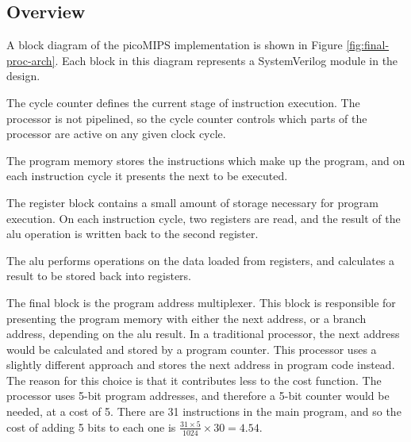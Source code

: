 \subsection{Overview} \label{sec:sys-overview}

A block diagram of the picoMIPS implementation is shown in Figure \ref{fig:final-proc-arch}. Each block in this diagram represents a SystemVerilog module in the design.

The cycle counter defines the current stage of instruction execution. The processor is not pipelined, so the cycle counter controls which parts of the processor are active on any given clock cycle.

The program memory stores the instructions which make up the program, and on each instruction cycle it presents the next to be executed.

The register block contains a small amount of storage necessary for program execution. On each instruction cycle, two registers are read, and the result of the \gls{alu} operation is written back to the second register.

The \gls{alu} performs operations on the data loaded from registers, and calculates a result to be stored back into registers.

The final block is the program address multiplexer. This block is responsible for presenting the program memory with either the next address, or a branch address, depending on the \gls{alu} result. In a traditional processor, the next address would be calculated and stored by a program counter. This processor uses a slightly different approach and stores the next address in program code instead. The reason for this choice is that it contributes less to the cost function. The processor uses 5-bit program addresses, and therefore a 5-bit counter would be needed, at a cost of 5. There are 31 instructions in the main program, and so the cost of adding 5 bits to each one is $\frac{31 \times 5}{1024}\times 30 = 4.54$.

